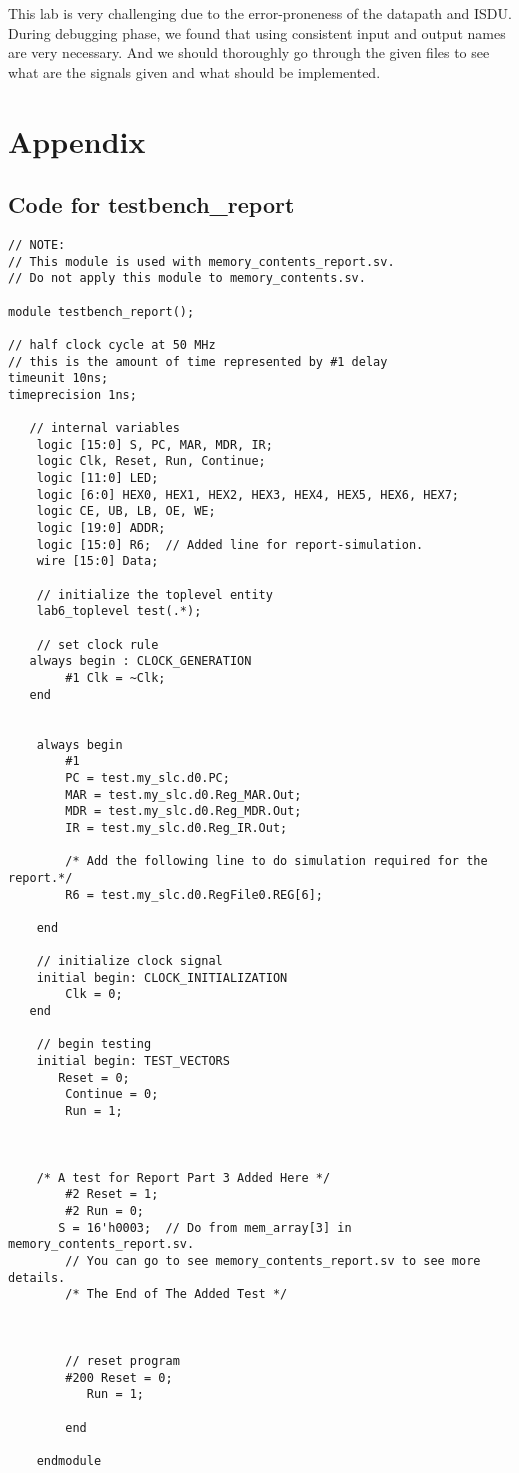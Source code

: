 \documentclass[11pt]{article}
\begin{document}
This lab is very challenging due to the error-proneness of the datapath and ISDU. During debugging phase, we found that using consistent input and output names are very necessary. And we should thoroughly go through the given files to see what are the signals given and what should be implemented.

\appendix
\section{Appendix}
\label{appendix_A}
\subsection{Code for testbench\_report}
\begin{lstlisting}
// NOTE:
// This module is used with memory_contents_report.sv. 
// Do not apply this module to memory_contents.sv.    

module testbench_report();

// half clock cycle at 50 MHz
// this is the amount of time represented by #1 delay
timeunit 10ns;
timeprecision 1ns;

   // internal variables
	logic [15:0] S, PC, MAR, MDR, IR;
	logic Clk, Reset, Run, Continue;
	logic [11:0] LED;
	logic [6:0] HEX0, HEX1, HEX2, HEX3, HEX4, HEX5, HEX6, HEX7;
	logic CE, UB, LB, OE, WE;
	logic [19:0] ADDR;
	logic [15:0] R6;  // Added line for report-simulation.
	wire [15:0] Data;

	// initialize the toplevel entity
	lab6_toplevel test(.*);
	
	// set clock rule
   always begin : CLOCK_GENERATION 
		#1 Clk = ~Clk;
   end

	
	always begin
		#1
		PC = test.my_slc.d0.PC;
		MAR = test.my_slc.d0.Reg_MAR.Out;
		MDR = test.my_slc.d0.Reg_MDR.Out;
		IR = test.my_slc.d0.Reg_IR.Out;
		
		/* Add the following line to do simulation required for the report.*/
		R6 = test.my_slc.d0.RegFile0.REG[6];

	end
	
	// initialize clock signal 
	initial begin: CLOCK_INITIALIZATION 
		Clk = 0;
   end
	
	// begin testing
	initial begin: TEST_VECTORS
	   Reset = 0;
		Continue = 0;
		Run = 1;
		
		
		
	/* A test for Report Part 3 Added Here */
		#2 Reset = 1;
		#2 Run = 0;
	   S = 16'h0003;  // Do from mem_array[3] in memory_contents_report.sv.
		// You can go to see memory_contents_report.sv to see more details.
        /* The End of The Added Test */
        
        
        
        // reset program
        #200 Reset = 0;
           Run = 1;
    
        end
         
    endmodule
\end{lstlisting}
\end{document}
